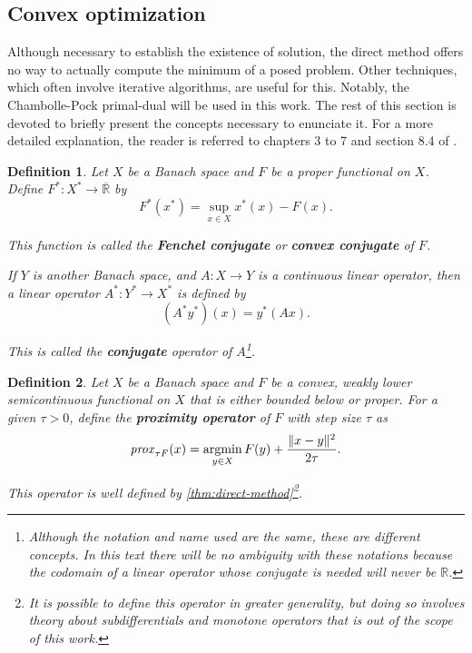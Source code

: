 \documentclass[twocolumn,twoside,a4paper,10pt]{IEEEtran}
\newtheorem{definition}{Definition}
\DeclareMathOperator*{\argmin}{\operatorname*{argmin}}
\DeclareMathOperator*{\argmin}{arg\,min}
\begin{document}
\subsection{Convex optimization} Although necessary to establish the existence of solution, the direct method offers no way to actually compute the minimum of a posed problem. Other techniques, which often involve iterative algorithms, are useful for this. Notably, the Chambolle-Pock primal-dual will be used in this work. The rest of this section is devoted to briefly present the concepts necessary to enunciate it. For a more detailed explanation, the reader is referred to chapters 3 to 7 and section 8.4 of \cite{clason2024introductionnonsmoothanalysisoptimization}.

\begin{definition}
  Let \(X\) be a Banach space and \(F\) be a proper functional on \(X\). Define \(F^*\colon X^*\to\overline{\mathbb{R}}\) by
  \[
    F^*(x^*) = \sup_{x\in X}x^*(x) - F(x)
  .\]

  This function is called the \textbf{Fenchel conjugate} or \textbf{convex conjugate} of \(F\).

  If \(Y\) is another Banach space, and \(A\colon X\to Y\) is a continuous linear operator, then a linear operator \(A^*\colon Y^*\to X^*\) is defined by
  \[
     (A^*y^*)(x) = y^*(Ax)
  .\]

  This is called the \textbf{conjugate} operator of \(A\)\footnote{Although the notation and name used are the same, these are different concepts. In this text there will be no ambiguity with these notations because the codomain of a linear operator whose conjugate is needed will never be \(\mathbb{R}\).}.
\end{definition}

\begin{definition}
  Let \(X\) be a Banach space and \(F\) be a convex, weakly lower semicontinuous functional on \(X\) that is either bounded below or proper. For a given \(\tau>0\), define the \textbf{proximity operator} of \(F\) with step size \(\tau\) as
  \[
    \text{\emph{prox}}_{\tau F}(x) = \argmin_{y\in X}F(y) + \frac{\|x-y\|^2}{2\tau}
  .\]

  This operator is well defined by \cref{thm:direct-method}\footnote{It is possible to define this operator in greater generality, but doing so involves theory about subdifferentials and monotone operators that is out of the scope of this work.}.
\end{definition}
\end{document}

